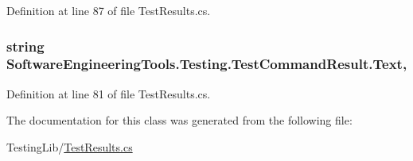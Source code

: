 Definition at line 87 of file Test\+Results.\+cs.

\hypertarget{class_software_engineering_tools_1_1_testing_1_1_test_command_result_a2f1d65eb07c34822f08e885f844ca0b2}{
\subsubsection[{Text}]{\setlength{\rightskip}{0pt plus 5cm}string Software\+Engineering\+Tools.\+Testing.\+Test\+Command\+Result.\+Text\hspace{0.3cm}{\ttfamily [get]}, {\ttfamily [set]}}}\label{class_software_engineering_tools_1_1_testing_1_1_test_command_result_a2f1d65eb07c34822f08e885f844ca0b2}


Definition at line 81 of file Test\+Results.\+cs.



The documentation for this class was generated from the following file\+:\begin{DoxyCompactItemize}
\item 
Testing\+Lib/\hyperlink{_test_results_8cs}{Test\+Results.\+cs}\end{DoxyCompactItemize}
